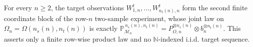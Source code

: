For every \(n\ge2\), the target observations \(W^t_{1,n},\ldots,W^t_{n_t(n),n}\) form the second finite coordinate block of the row-\(n\) two-sample experiment, whose joint law on \(\Omega_n=\Omega(n_s(n),n_t(n))\) is exactly \(\mathbb P_{\mathcal M_n}^{\,n_s(n),n_t(n)}=P_{O,n}^{\otimes n_s(n)}\otimes b_n^{\otimes n_t(n)}\). This asserts only a finite row-wise product law and no \(\mathbb N\)-indexed i.i.d. target sequence.